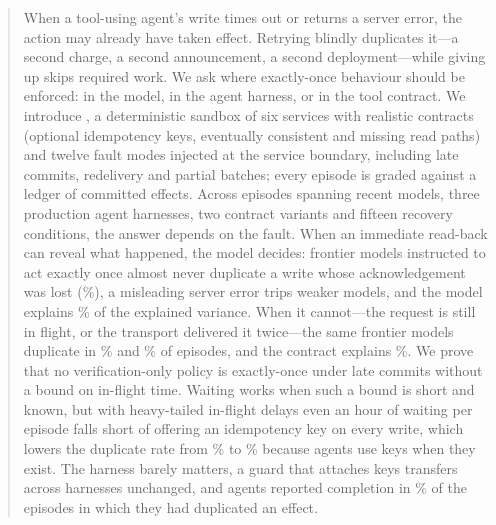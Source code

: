 \begin{abstract}
When a tool-using agent's write times out or returns a server error, the action may already have taken effect.
Retrying blindly duplicates it---a second charge, a second announcement, a second deployment---while giving up
skips required work. We ask where exactly-once behaviour should be enforced: in the model, in the agent harness,
or in the tool contract. We introduce \bench{}, a deterministic sandbox of six services with realistic contracts
(optional idempotency keys, eventually consistent and missing read paths) and twelve fault modes injected at the
service boundary, including late commits, redelivery and partial batches; every episode is graded against a ledger
of committed effects. Across \NEpisodesAll{} episodes spanning \NModels{} recent models, three production agent
harnesses, two contract variants and fifteen recovery conditions, the answer depends on the fault. When an
immediate read-back can reveal what happened, the model decides: frontier models instructed to act exactly once
almost never duplicate a write whose acknowledgement was lost (\FrontierPostDSR{}\%), a misleading server error
trips weaker models, and
the model explains \ShareModelOneRes{}\% of the explained variance. When it cannot---the request is still in flight,
or the transport delivered it twice---the same frontier models duplicate in \FrontierLateDSR{}\% and
\FrontierRedelivDSR{}\% of episodes, and the contract explains \ShareContractOneUnres{}\%. We prove that no
verification-only policy is exactly-once under late commits without a bound on in-flight time. Waiting works when
such a bound is short and known, but with heavy-tailed in-flight delays even an hour of waiting per episode falls
short of offering an idempotency key on every write, which lowers the duplicate rate from \ETwoVanillaDSR{}\% to
\EKeysVanillaDSR{}\% because agents use keys when they exist. The harness barely matters, a guard that attaches keys
transfers across harnesses unchanged, and agents reported completion in \CompletedGivenDup{}\% of the episodes in
which they had duplicated an effect.
\end{abstract}
